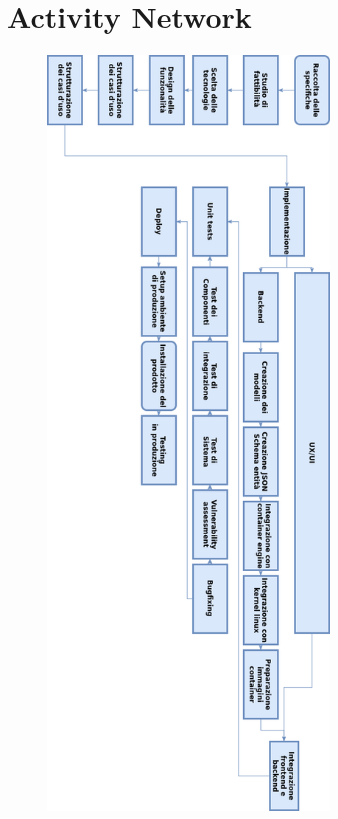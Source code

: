 \documentclass[../main.tex]{subfiles}
\begin{document}
\section{Activity Network}
\begin{figure}[H]
    \center
    \includegraphics[height=20cm]{capitoli/activitynetwork.png}
\end{figure}
\clearpage
\end{document}
